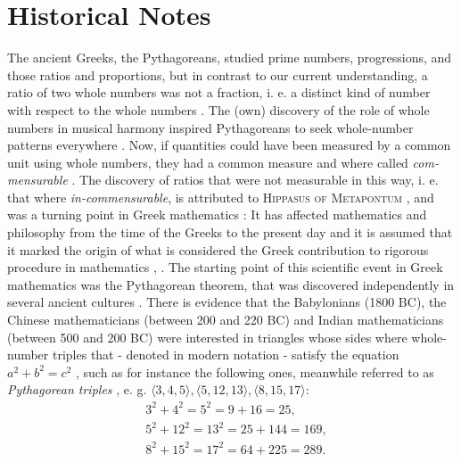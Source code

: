 \documentclass[11pt]{amsart}
\theoremstyle{definition}
\begin{document}
\section{Historical Notes}
The ancient Greeks, the Pythagoreans, studied prime numbers, progressions, and those ratios and proportions, but in contrast to our current understanding, a ratio of two whole numbers was not a fraction, i. e. a distinct kind of number with respect to the whole numbers \cite[32]{klineMathematicalThoughtAncient1990}.
The (own) discovery of the role of whole numbers in musical harmony inspired Pythagoreans to seek whole-number patterns everywhere \cite[11]{stillwellMathematicsItsHistory2010}.
Now, if quantities could have been measured by a common unit using whole numbers, they had a common measure and where called \emph{com-mensurable} \cite[32]{klineMathematicalThoughtAncient1990}.
The discovery of ratios that were not measurable in this way, i. e. that where \emph{in-commensurable}, is attributed to \textsc{Hippasus of Metapontum} \cite[32]{klineMathematicalThoughtAncient1990}, and was a turning point in Greek mathematics \cite[1]{stillwellStoryProofLogic2022}: It has affected mathematics and philosophy from the time of the Greeks to the present day \cite[59-60]{courantWhatMathematicsElementary1996} and it is assumed that it marked the origin of what is considered the Greek contribution to rigorous procedure in mathematics \cite[59]{courantWhatMathematicsElementary1996}, \cite[1]{stillwellStoryProofLogic2022}.
The starting point of this scientific event \cite[59]{courantWhatMathematicsElementary1996} in Greek mathematics was the Pythagorean theorem, that was discovered independently in several ancient cultures \cite[3]{stillwellStoryProofLogic2022}.
There is evidence \cite[4]{stillwellMathematicsItsHistory2010} that the Babylonians (1800 BC), the Chinese mathematicians (between 200 and 220 BC) and Indian mathematicians (between 500 and 200 BC) were interested in triangles whose sides where whole-number triples that - denoted in modern notation - satisfy the equation \(a^{2} + b^{2} = c^{2}\) \cite[3-4]{stillwellStoryProofLogic2022}, such as for instance the following ones, meanwhile referred to as \emph{Pythagorean triples} \cite[4]{stillwellMathematicsItsHistory2010}, e. g. \(\langle 3, 4, 5 \rangle, \langle 5, 12, 13 \rangle, \langle 8, 15, 17 \rangle\):
\begin{align*}
     & 3^{2} + 4^{2}  =  5^{2}  = 9 + 16 = 25,     \\
     & 5^{2} + 12^{2} =  13^{2}  = 25 + 144 = 169, \\
     & 8^{2} + 15^{2} = 17^{2} = 64 + 225 = 289.
\end{align*}
\end{document}
